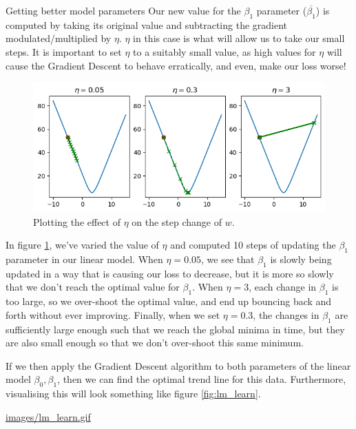 \documentclass[10pt]{beamer}
\begin{document}
\begin{frame}[fragile,allowframebreaks,label=]{Getting better model parameters}
Our new value for the \(\beta_1\) parameter (\(\overline{\beta_1}\)) is computed by taking its
original value and subtracting the gradient modulated/multiplied by \(\eta\). \(\eta\) in
this case is what will allow us to take our \alert{small steps}. It is important to set
\(\eta\) to a suitably small value, as high values for \(\eta\) will cause the Gradient
Descent to behave erratically, and even, make our loss worse!

\begin{figure}[htbp]
\centering
\includegraphics[width=.9\linewidth]{images/small_step_eta.png}
\caption{\label{fig:eta}Plotting the effect of \(\eta\) on the step change of \(w\).}
\end{figure}

In figure \ref{fig:eta}, we've varied the value of \(\eta\) and computed 10 steps of updating
the \(\beta_1\) parameter in our linear model. When \(\eta=0.05\), we see that \(\beta_1\) is slowly
being updated in a way that is causing our loss to decrease, but it is more so slowly
that we don't reach the optimal value for \(\beta_1\). When \(\eta=3\), each change in \(\beta_1\) is
too large, so we over-shoot the optimal value, and end up bouncing back and forth
without ever improving. Finally, when we set \(\eta=0.3\), the changes in \(\beta_1\) are
sufficiently large enough such that we reach the \alert{global minima} in time, but they are
also small enough so that we don't over-shoot this same minimum.

If we then apply the Gradient Descent algorithm to both parameters of the linear
model \(\beta_0, \beta_1\), then we can find the optimal trend line for this data. Furthermore,
visualising this will look something like figure \ref{fig:lm_learn}.

\url{images/lm\_learn.gif}
\end{frame}
\end{document}
